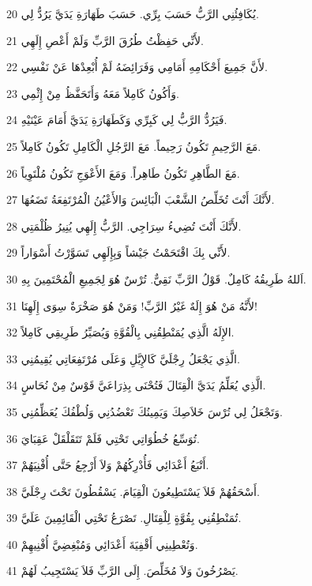 \par 20 يُكَافِئُنِي الرَّبُّ حَسَبَ بِرِّي. حَسَبَ طَهَارَةِ يَدَيَّ يَرُدُّ لِي.
\par 21 لأَنِّي حَفِظْتُ طُرُقَ الرَّبِّ وَلَمْ أَعْصِ إِلَهِي.
\par 22 لأَنَّ جَمِيعَ أَحْكَامِهِ أَمَامِي وَفَرَائِضَهُ لَمْ أُبْعِدْهَا عَنْ نَفْسِي.
\par 23 وَأَكُونُ كَامِلاً مَعَهُ وَأَتَحَفَّظُ مِنْ إِثْمِي.
\par 24 فَيَرُدُّ الرَّبُّ لِي كَبِرِّي وَكَطَهَارَةِ يَدَيَّ أَمَامَ عَيْنَيْهِ.
\par 25 مَعَ الرَّحِيمِ تَكُونُ رَحِيماً. مَعَ الرَّجُلِ الْكَامِلِ تَكُونُ كَامِلاً.
\par 26 مَعَ الطَّاهِرِ تَكُونُ طَاهِراً. وَمَعَ الأَعْوَجِ تَكُونُ مُلْتَوِياً.
\par 27 لأَنَّكَ أَنْتَ تُخَلِّصُ الشَّعْبَ الْبَائِسَ وَالأَعْيُنُ الْمُرْتَفِعَةُ تَضَعُهَا.
\par 28 لأَنَّكَ أَنْتَ تُضِيءُ سِرَاجِي. الرَّبُّ إِلَهِي يُنِيرُ ظُلْمَتِي.
\par 29 لأَنِّي بِكَ اقْتَحَمْتُ جَيْشاً وَبِإِلَهِي تَسَوَّرْتُ أَسْوَاراً.
\par 30 اَللهُ طَرِيقُهُ كَامِلٌ. قَوْلُ الرَّبِّ نَقِيٌّ. تُرْسٌ هُوَ لِجَمِيعِ الْمُحْتَمِينَ بِهِ.
\par 31 لأَنَّهُ مَنْ هُوَ إِلَهٌ غَيْرُ الرَّبِّ! وَمَنْ هُوَ صَخْرَةٌ سِوَى إِلَهِنَا!
\par 32 الإِلَهُ الَّذِي يُمَنْطِقُنِي بِالْقُوَّةِ وَيُصَيِّرُ طَرِيقِي كَامِلاً.
\par 33 الَّذِي يَجْعَلُ رِجْلَيَّ كَالإِيَّلِ وَعَلَى مُرْتَفِعَاتِي يُقِيمُنِي.
\par 34 الَّذِي يُعَلِّمُ يَدَيَّ الْقِتَالَ فَتُحْنَى بِذِرَاعَيَّ قَوْسٌ مِنْ نُحَاسٍ.
\par 35 وَتَجْعَلُ لِي تُرْسَ خَلاَصِكَ وَيَمِينُكَ تَعْضُدُنِي وَلُطْفُكَ يُعَظِّمُنِي.
\par 36 تُوَسِّعُ خُطُوَاتِي تَحْتِي فَلَمْ تَتَقَلْقَلْ عَقِبَايَ.
\par 37 أَتْبَعُ أَعْدَائِي فَأُدْرِكُهُمْ وَلاَ أَرْجِعُ حَتَّى أُفْنِيَهُمْ.
\par 38 أَسْحَقُهُمْ فَلاَ يَسْتَطِيعُونَ الْقِيَامَ. يَسْقُطُونَ تَحْتَ رِجْلَيَّ.
\par 39 تُمَنْطِقُنِي بِقُوَّةٍ لِلْقِتَالِ. تَصْرَعُ تَحْتِي الْقَائِمِينَ عَلَيَّ.
\par 40 وَتُعْطِينِي أَقْفِيَةَ أَعْدَائِي وَمُبْغِضِيَّ أُفْنِيهِمْ.
\par 41 يَصْرُخُونَ وَلاَ مُخَلِّصَ. إِلَى الرَّبِّ فَلاَ يَسْتَجِيبُ لَهُمْ.
